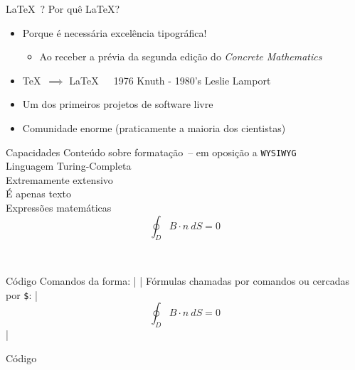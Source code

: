 \documentclass{beamer}
\begin{document}
  \begin{frame}{\LaTeX\ ?}
    Por quê \LaTeX?\\\pause
    \begin{itemize}
      \item{\selectfont Porque é necessária excelência tipográfica!\pause
        \begin{itemize}
          \item Ao receber a prévia da segunda edição do {\em Concrete Mathematics}\pause
        \end{itemize}}
      \item \TeX\ $\implies$ \LaTeX\ \ \ {\scriptsize 1976 Knuth - 1980's Leslie Lamport}\pause
      \item Um dos primeiros projetos de software livre\pause
      \item Comunidade enorme (praticamente a maioria dos cientistas)
    \end{itemize}
  \end{frame}
  \begin{frame}[fragile]{Capacidades}
     Conteúdo sobre formatação\pause\ {\scriptsize-- em oposição a \texttt{WYSIWYG}}\\\pause
     Linguagem Turing-Completa\\\pause
    \onslide<4>{$ \rightarrow $} Extremamente extensivo\\\pause
     É apenas texto\\\pause
     Expressões matemáticas\\\pause 
      $$ \oint_{D} B\cdot n\ dS = 0 $$
    \begin{center}
      \pause\href{doc/rogers}{}\\
    \end{center}
\end{frame}
  \begin{frame}[fragile]{Código}
    Comandos da forma: |  |\pause
    Fórmulas chamadas por comandos ou cercadas por {\texttt \$}: |$$ \oint_{D} B\cdot n\ dS = 0 $$|
\end{frame}
  \begin{frame}[fragile]{Código}
    \pause
\end{frame}
\end{document}
